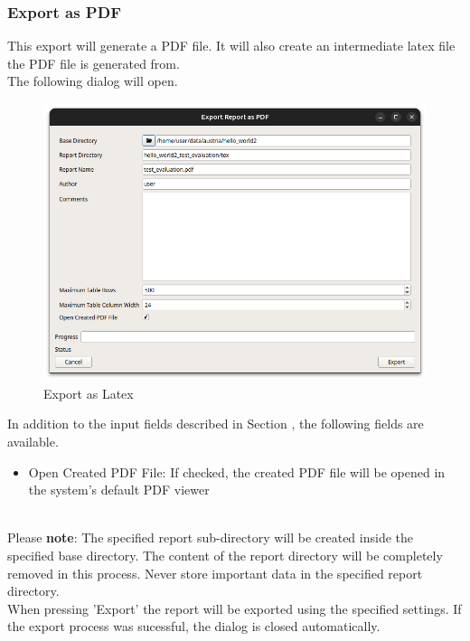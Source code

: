 \subsubsection{Export as PDF}
\label{sec:report_export_pdf}

This export will generate a PDF file. It will also create an intermediate latex file the PDF file is generated from. \\

The following dialog will open.

\begin{figure}[H]
    \hspace*{-2.5cm}
    \center
    \includegraphics[width=12cm,frame]{figures/export_pdf.png}
  \caption{Export as Latex}
\end{figure}

In addition to the input fields described in Section , 
the following fields are available.

\begin{itemize}  
    \item Open Created PDF File: If checked, the created PDF file will be opened in the system's default PDF viewer
\end{itemize}
\ \\

Please \textbf{note}: The specified report sub-directory will be created inside the specified base directory.
The content of the report directory will be completely removed in this process.
Never store important data in the specified report directory. \\

When pressing 'Export' the report will be exported using the specified settings.
If the export process was sucessful, the dialog is closed automatically. \\


